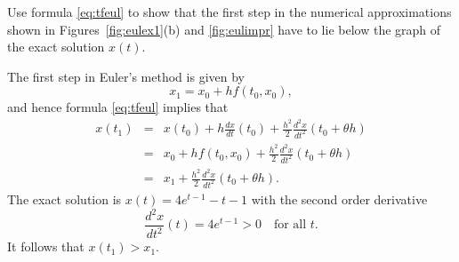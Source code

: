 \documentclass{ximera}
\begin{document}
\begin{exercise} \label{c15.1.4a}
Use formula \eqref{eq:tfeul} to show that the first step in
the numerical approximations shown in Figures~\ref{fig:eulex1}(b)
and \ref{fig:eulimpr} have to lie below the graph of
the exact solution $x(t)$.

\begin{solution}
The first step in Euler's method is given by
\[
x_1 = x_0 + hf(t_0,x_0),
\]
and hence formula \eqref{eq:tfeul} implies that
\begin{eqnarray*}
x(t_1) &=&  x(t_0)+h\frac{dx}{dt}(t_0)+
\frac{h^2}{2}\frac{d^2x}{dt^2}(t_0+\theta h)\\
&=& x_0 + hf(t_0,x_0) +\frac{h^2}{2}\frac{d^2x}{dt^2}(t_0+\theta h)\\
&=& x_1 +\frac{h^2}{2}\frac{d^2x}{dt^2}(t_0+\theta h).
\end{eqnarray*}
The exact solution is $x(t)= 4e^{t-1}-t-1$ with the second order
derivative
\[
\frac{d^2x}{dt^2}(t) = 4e^{t-1}>0\quad \mbox{for all $t$.}
\]
It follows that $x(t_1) > x_1$.

\end{solution}
\end{exercise}
\end{document}
